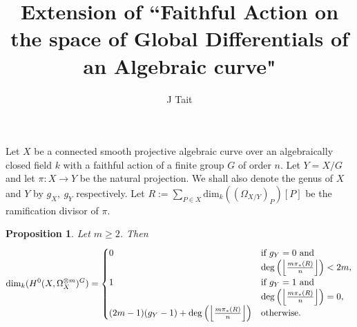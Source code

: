 \documentclass[11pt]{article} %
\title{Extension of ``Faithful Action on the space of Global Differentials of an Algebraic curve"}
\author{J Tait}
\newtheorem{prop}{Proposition}
\begin{document}
\maketitle

Let $X$ be a connected smooth projective algebraic curve over an algebraically closed field $k$ with a faithful action of a finite group $G$ of order $n$. Let $Y=X/G$ and let $\pi:X\rightarrow Y$ be the natural projection. We shall also denote the genus of $X$ and $Y$ by $g_X,\ g_Y$ respectively. Let $R:=\sum_{P\in X} \mbox{dim}_k((\Omega_{X/Y})_P)[P]$ be the ramification divisor of $\pi$.\\


\begin{prop}
	Let $m\geq 2$. Then
\begin{equation*}
\dim_k(H^0(X,\Omega_{X}^{\otimes m})^G)  =
\begin{cases}
0 & \text{if } g_Y=0\ \text{and } \\ & \deg\Big(\Big{\lfloor}\frac{m\pi_*(R)}{n}\Big{\rfloor}\Big)<2m,\\
1 & \text{if } g_Y=1\ \text{and } \\ & \deg\Big(\Big{\lfloor}\frac{m\pi_*(R)}{n}\Big{\rfloor}\Big)=0,\\
(2m-1)(g_Y-1) +\deg\Big(\Big{\lfloor}{\frac{m\pi_* (R)}{n}}\Big{\rfloor}\Big) & \text{otherwise}.
\end{cases}
\end{equation*}
\end{prop}
\end{document}
